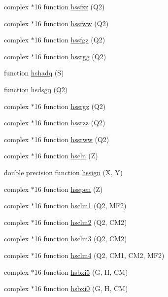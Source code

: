 \begin{DoxyCompactItemize}
\item 
complex $\ast$16 function \hyperlink{djangoh__h_8f_a58a60617eda31856420c23f87d10fbeb}{hssfzz} (Q2)
\item 
complex $\ast$16 function \hyperlink{djangoh__h_8f_a7c6d4a59bfe41cfcb95989acaddf651c}{hssfww} (Q2)
\item 
complex $\ast$16 function \hyperlink{djangoh__h_8f_a079f3d821e8ec479336f1a89dc20a8e0}{hssfgz} (Q2)
\item 
complex $\ast$16 function \hyperlink{djangoh__h_8f_a8fbe59003676acd8b388d3965e585a66}{hssrgg} (Q2)
\item 
function \hyperlink{djangoh__h_8f_a3f00399e4ac825fb1b7dbeb982380960}{hshadq} (S)
\item 
function \hyperlink{djangoh__h_8f_a9cd17c523f49f61903b0d778ec11a2f3}{hsdsgq} (Q2)
\item 
complex $\ast$16 function \hyperlink{djangoh__h_8f_ab8dc6ec1b48539fafef87e1abf84d1ac}{hssrgz} (Q2)
\item 
complex $\ast$16 function \hyperlink{djangoh__h_8f_a55e3921f77e29078352fea7906002fba}{hssrzz} (Q2)
\item 
complex $\ast$16 function \hyperlink{djangoh__h_8f_a75f51f829e7f7cf9133330bad9a42ac5}{hssrww} (Q2)
\item 
complex $\ast$16 function \hyperlink{djangoh__h_8f_a592dda9797bd5057f53f7e3955c16ab9}{hscln} (Z)
\item 
double precision function \hyperlink{djangoh__h_8f_aa20f442acbbf3733b98be0aa1050a531}{hssign} (X, Y)
\item 
complex $\ast$16 function \hyperlink{djangoh__h_8f_ae7f485154ac96066356885f2e73926ad}{hsspen} (Z)
\item 
complex $\ast$16 function \hyperlink{djangoh__h_8f_aa73a3da66e3805e1c582500aa571bb24}{hsclm1} (Q2, M\+F2)
\item 
complex $\ast$16 function \hyperlink{djangoh__h_8f_a9191e08bf7b1e7691309c6944bc34528}{hsclm2} (Q2, C\+M2)
\item 
complex $\ast$16 function \hyperlink{djangoh__h_8f_a720a93e4f8ea99c1f2266cbbefc41cce}{hsclm3} (Q2, C\+M2)
\item 
complex $\ast$16 function \hyperlink{djangoh__h_8f_adda066980e90daedd90329553f306765}{hsclm4} (Q2, C\+M1, C\+M2, M\+F2)
\item 
complex $\ast$16 function \hyperlink{djangoh__h_8f_a1621d429d11e21c0ae1599f626901aea}{hsbxi5} (G, H, CM)
\item 
complex $\ast$16 function \hyperlink{djangoh__h_8f_a492a2e1e1e804fc597f8106ff0f9d32d}{hsbxi0} (G, H, CM)

\end{DoxyCompactItemize}
